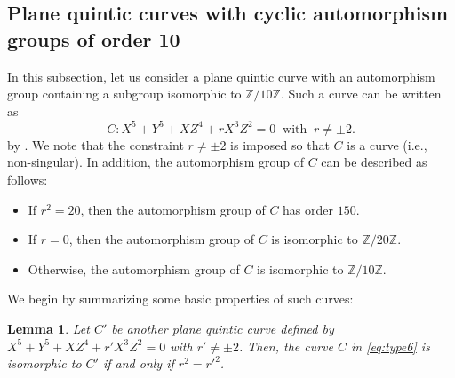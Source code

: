\documentclass[10pt,a4paper]{amsart}
\newtheorem{Lem}[Def]{Lemma}
\begin{document}
\subsection{Plane quintic curves with cyclic automorphism groups of order 10}\label{subsec:type6}\vspace{0.5mm}
In this subsection, let us consider a plane quintic curve with an automorphism group containing a subgroup isomorphic to $\mathbb{Z}/10\mathbb{Z}$.
Such a curve can be written as\vspace{-1mm}
\begin{equation}\label{eq:type6}
    C: X^5+Y^5+XZ^4+rX^3Z^2 = 0 \ \text{ with }\ r \neq \pm 2.
\end{equation}
by \cite[Proposition 8]{BB}.
We note that the constraint $r \neq \pm 2$ is imposed so that $C$ is a curve (i.e., non-singular).
In addition, the automorphism group of $C$ can be described as follows:\vspace{-0.8mm}
\begin{itemize}
    \item If $r^2 = 20$, then the automorphism group of $C$ has order $150$.\vspace{-2.6mm}
    \item If $r = 0$, then the automorphism group of $C$ is isomorphic to $\mathbb{Z}/20\mathbb{Z}$.\vspace{-2.6mm}
    \item Otherwise, the automorphism group of $C$ is isomorphic to $\mathbb{Z}/10\mathbb{Z}$.
\end{itemize}
We begin by summarizing some basic properties of such curves:\vspace{-0.9mm}
\begin{Lem}\label{lem:isom_for_type6}
Let $C'$ be another plane quintic curve defined by $X^5+Y^5+XZ^4+r'X^3Z^2 = 0$ with $r' \neq \pm 2$.
Then, the curve $C$ in \eqref{eq:type6} is isomorphic to $C'$ if and only if $r^2 = r'^2$.\vspace{-0.5mm}
\end{Lem}
\end{document}
